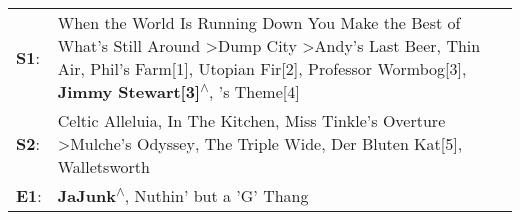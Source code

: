 \begin{supertabular}{p{0.03\textwidth}p{0.92\textwidth}}
 \textbf{S1}:  &  When the World Is Running Down You Make the Best of What's Still Around\textsuperscript{} \textgreater \enspace Dump City\textsuperscript{} \textgreater \enspace Andy's Last Beer\textsuperscript{}, \enspace Thin Air\textsuperscript{}, \enspace Phil's Farm[1]\textsuperscript{}, \enspace Utopian Fir[2]\textsuperscript{}, \enspace Professor Wormbog[3]\textsuperscript{}, \enspace \textbf{Jimmy Stewart[3]\textsuperscript{$\wedge$}}, 's Theme[4]\textsuperscript{}  \enspace  \\
 \textbf{S2}:  &                                                                                                                                                               Celtic Alleluia\textsuperscript{}, \enspace In The Kitchen\textsuperscript{}, \enspace Miss Tinkle's Overture\textsuperscript{} \textgreater \enspace Mulche's Odyssey\textsuperscript{}, \enspace The Triple Wide\textsuperscript{}, \enspace Der Bluten Kat[5]\textsuperscript{}, \enspace Walletsworth\textsuperscript{}  \enspace  \\
 \textbf{E1}:  &                                                                                                                                                                                                                                                                                                                                                                                             \textbf{JaJunk\textsuperscript{$\wedge$}}, \enspace Nuthin' but a 'G' Thang\textsuperscript{}  \enspace  \\
\end{supertabular}
